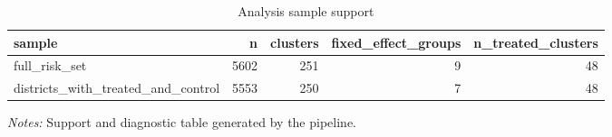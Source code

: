 \begin{table}[!htbp] \centering
\caption{Analysis sample support}
\begin{tabular}{lrrrr}
\toprule
sample & n & clusters & fixed\_effect\_groups & n\_treated\_clusters \\
\midrule
full\_risk\_set & 5602 & 251 & 9 & 48 \\
districts\_with\_treated\_and\_control & 5553 & 250 & 7 & 48 \\
\bottomrule
\end{tabular}

\begin{minipage}{0.98\textwidth}
\footnotesize \textit{Notes:} Support and diagnostic table generated by the pipeline.
\end{minipage}
\end{table}
